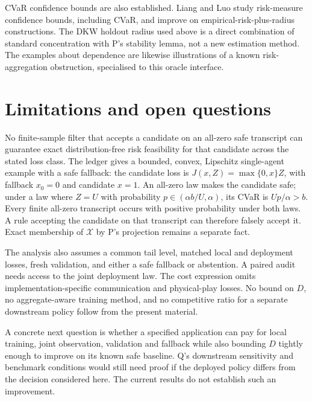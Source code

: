 \documentclass{article}
\begin{document}
CVaR confidence bounds are also established.  Liang and Luo
\cite{LiangLuo} study risk-measure confidence bounds, including CVaR,
and improve on empirical-risk-plus-radius constructions.  The DKW
holdout radius used above is a direct combination of standard
concentration with P's stability lemma, not a new estimation method.
The examples about dependence are likewise illustrations of a known
risk-aggregation obstruction, specialised to this oracle interface.

\section{Limitations and open questions}

No finite-sample filter that accepts a candidate on an all-zero safe
transcript can guarantee exact distribution-free risk feasibility for
that candidate across the stated loss class.  The ledger gives a bounded,
convex, Lipschitz single-agent example with a safe fallback: the
candidate loss is \(J(x,Z)=\max\{0,x\}Z\), with fallback \(x_0=0\)
and candidate \(x=1\).  An all-zero law makes the candidate safe;
under a law where \(Z=U\) with probability
\(p\in(\alpha b/U,\alpha)\), its CVaR is \(Up/\alpha>b\).
Every finite all-zero transcript occurs with positive probability
under both laws.  A rule accepting the candidate on that transcript
can therefore falsely accept it.  Exact membership of
\(\mathcal X\) by P's projection remains a separate fact.

The analysis also assumes a common tail level, matched local and
deployment losses, fresh validation, and either a safe fallback or
abstention.  A paired audit needs access to the joint deployment law.
The cost expression omits implementation-specific communication and
physical-play losses.  No bound on \(D\), no aggregate-aware training
method, and no competitive ratio for a separate downstream policy
follow from the present material.

A concrete next question is whether a specified application can pay
for local training, joint observation, validation and fallback while
also bounding \(D\) tightly enough to improve on its known safe
baseline.  Q's downstream sensitivity and benchmark conditions would
still need proof if the deployed policy differs from the decision
considered here.  The current results do not establish such an
improvement.



\end{document}
